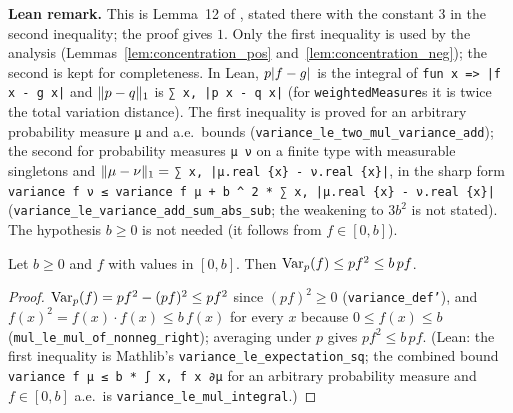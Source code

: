 \textbf{Lean remark.} This is Lemma~12 of \cite{menard2021fast}, stated there with the constant
$3$ in the second inequality; the proof gives $1$. Only the first inequality is used by the
analysis (Lemmas~\ref{lem:concentration_pos} and~\ref{lem:concentration_neg}); the second is
kept for completeness. In Lean, $p\lvert f - g \rvert$ is the integral of \texttt{fun x => |f x - g x|}
and $\lVert p - q \rVert_1$ is \texttt{∑ x, |p x - q x|} (for \texttt{weightedMeasure}s it is twice the
total variation distance). The first inequality is proved for an arbitrary probability measure
\texttt{μ} and a.e.\ bounds (\texttt{variance\_le\_two\_mul\_variance\_add}); the second for
probability measures \texttt{μ ν} on a finite type with measurable singletons and
$\lVert \mu - \nu \rVert_1 = $ \texttt{∑ x, |μ.real \{x\} - ν.real \{x\}|}, in the sharp form
\texttt{variance f ν ≤ variance f μ + b \^{} 2 * ∑ x, |μ.real \{x\} - ν.real \{x\}|}
(\texttt{variance\_le\_variance\_add\_sum\_abs\_sub}; the weakening to $3b^2$ is not stated). The
hypothesis $b \ge 0$ is not needed (it follows from $f \in [0, b]$).

\begin{lemma}\label{lem:var_le_range_mean}
\leanok
Let $b \ge 0$ and $f$ with values in $[0, b]$. Then $\operatorname{Var}_p(f) \le pf^2 \le b\, pf$.
\end{lemma}

\begin{proof}
\leanok
$\operatorname{Var}_p(f) = pf^2 - (pf)^2 \le pf^2$ since $(pf)^2 \ge 0$ (\texttt{variance\_def'}), and
$f(x)^2 = f(x) \cdot f(x) \le b\, f(x)$ for every $x$ because $0 \le f(x) \le b$
(\texttt{mul\_le\_mul\_of\_nonneg\_right}); averaging under $p$ gives $pf^2 \le b\,pf$.
(Lean: the first inequality is Mathlib's \texttt{variance\_le\_expectation\_sq}; the combined
bound \texttt{variance f μ ≤ b * ∫ x, f x ∂μ} for an arbitrary probability measure and
$f \in [0, b]$ a.e.\ is \texttt{variance\_le\_mul\_integral}.)
\end{proof}
